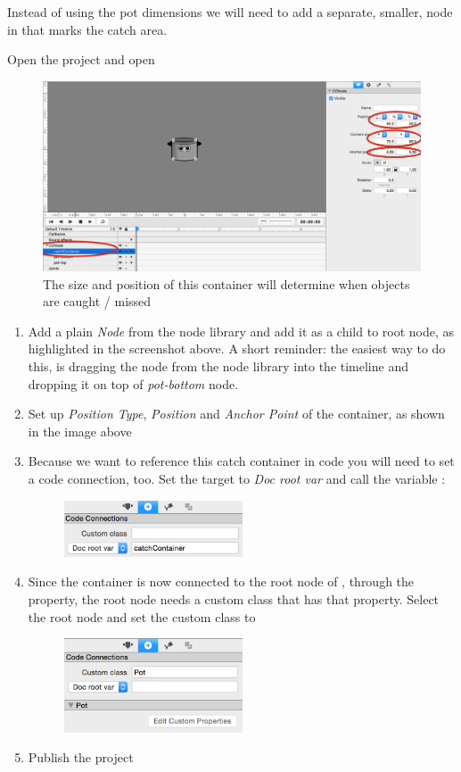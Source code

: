 Instead of using the pot dimensions we will need to add a separate, smaller,
node in \SB{} that marks the catch area. 
\begin{leftbar}
Open the \SB{} project and open 
\begin{figure}[H]
		\centering
		\includegraphics[width=0.8\linewidth]{images/Chapter6/add_catch_container_2.png}
		\caption{The size and position of this container will determine when objects
		are caught / missed}
\end{figure}

\begin{enumerate}
  \item Add a plain \textit{Node} from the node library and add it as a child to
root node, as highlighted in the screenshot above. A short
reminder: the easiest way to do this, is dragging the node from the node library
into the timeline and dropping it on top of \textit{pot-bottom} node.
  \item Set up \textit{Position Type}, \textit{Position} and \textit{Anchor
  Point} of the container, as shown in the image above
  \item Because we want to reference this catch container in code you will need to set a
code connection, too. Set the target to \textit{Doc root var} and call the
variable :
\begin{figure}[H]
    \centering
    \includegraphics[width=150pt]{images/Chapter6/container_cc.png}
\end{figure}
  \item Since the container is now connected to the root
  node of , through the 
  property, the root node needs a custom class that has that property. Select
  the root node and set the custom class to 
\begin{figure}[H]
    \centering
    \includegraphics[width=150pt]{images/Chapter6/pot_cc.png}
\end{figure}
\item Publish the \SB{} project
\end{enumerate}
\end{leftbar}

